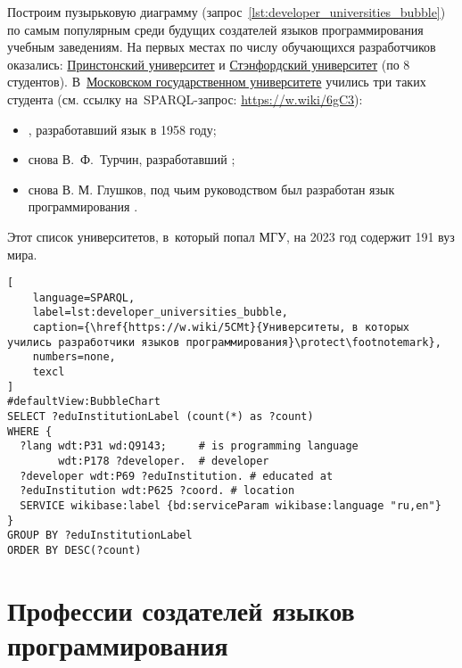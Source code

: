 Построим пузырьковую диаграмму (запрос~\ref{lst:developer_universities_bubble}) 
по самым популярным среди будущих создателей языков программирования учебным заведениям. 
На первых местах по числу обучающихся разработчиков оказались: 
\href{https://www.wikidata.org/wiki/Q21578}{Принстонский университет} и 
\href{https://www.wikidata.org/wiki/Q41506}{Стэнфордский университет} (по 8 студентов). 
В~\href{https://ru.wikipedia.org/wiki/Московский_государственный_университет}{Московском государственном университете} 
учились три таких студента 
(см. ссылку на~SPARQL-запрос: \href{https://w.wiki/6gC3}{https://w.wiki/6gC3}):
\begin{itemize}
    \item {}, разработавший язык  в 1958 году;

    \item снова В.~Ф.~Турчин, разработавший ;

    \item снова В. М. Глушков, под чьим руководством был разработан 
        язык программирования .
\end{itemize}
Этот список университетов, в~который попал МГУ, на 2023 год содержит 191 вуз мира.



\newpage
\begin{lstlisting}[
	language=SPARQL,
	label=lst:developer_universities_bubble,
    caption={\href{https://w.wiki/5CMt}{Университеты, в которых учились разработчики языков программирования}\protect\footnotemark},
    numbers=none,
	texcl
]
#defaultView:BubbleChart
SELECT ?eduInstitutionLabel (count(*) as ?count) 
WHERE {
  ?lang wdt:P31 wd:Q9143;     # is programming language
        wdt:P178 ?developer.  # developer
  ?developer wdt:P69 ?eduInstitution. # educated at
  ?eduInstitution wdt:P625 ?coord. # location
  SERVICE wikibase:label {bd:serviceParam wikibase:language "ru,en"}
}
GROUP BY ?eduInstitutionLabel
ORDER BY DESC(?count)
\end{lstlisting}




\section{Профессии создателей языков программирования}

